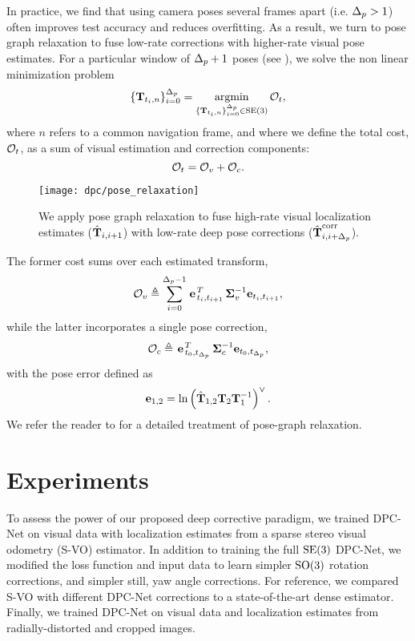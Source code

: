 In practice, we find that using camera poses several frames apart (i.e. $\Delta_p > 1$) often improves test accuracy and reduces overfitting. As a result, we turn to pose graph relaxation to fuse low-rate corrections with higher-rate visual pose estimates. For a particular window of $\Delta_p + 1$ poses (see ), we solve the non linear minimization problem
\begin{equation}
	\{\boldsymbol{\mathbf{T}}_{t_i, n} \}_{i=0}^{\Delta_p} = \operatorname*{argmin}_{\{\boldsymbol{\mathbf{T}}_{t_i, n} \}_{i=0}^{\Delta_p} \in \mathrm{SE}(3)} \mathcal{O}_t,
\end{equation}
where $n$ refers to a common navigation frame, and where we define the total cost, $\mathcal{O}_t$, as a sum of visual estimation and correction components:
\begin{equation}
	\mathcal{O}_t = \mathcal{O}_v + \mathcal{O}_c.
\end{equation}

\begin{figure}
	\centering
	\texttt{[image: dpc/pose\_relaxation]}
	\caption{We apply pose graph relaxation to fuse high-rate visual localization estimates ($\hat{\boldsymbol{\mathbf{T}}}_{i,i+1}$) with low-rate deep pose corrections ($\hat{\boldsymbol{\mathbf{T}}}_{i,i+\Delta_p}^{\text{corr}}$).}
	\label{fig:posegraph_relaxation}
	\vspace{-1em}
\end{figure}

\noindent The former cost sums over each estimated transform,
\begin{equation}
	\mathcal{O}_v \triangleq \sum_{i=0}^{\Delta_p-1}\left.{\boldsymbol{\mathbf{e}}}\right.^T_{t_i,t_{i+1}}\boldsymbol{\mathbf{\Sigma}}_v^{-1} \boldsymbol{\mathbf{e}}_{t_i,t_{i+1}},
\end{equation}
while the latter incorporates a single pose correction,
\begin{equation}
	\mathcal{O}_c \triangleq \left.{\boldsymbol{\mathbf{e}}}\right.^T_{t_0,t_{\Delta_p}}\boldsymbol{\mathbf{\Sigma}}_c^{-1} \boldsymbol{\mathbf{e}}_{t_0,t_{\Delta_p}},
\end{equation}
with the pose error defined as 
\begin{equation}
	\boldsymbol{\mathbf{e}}_{1,2} = \text{ln}\left({\hat{\boldsymbol{\mathbf{T}}}_{1,2} \boldsymbol{\mathbf{T}}_{2}  \boldsymbol{\mathbf{T}}^{-1}_{1}} \right)^{\vee}.
\end{equation}
We refer the reader to \cite{Barfoot2017-ri} for a detailed treatment of pose-graph relaxation.

\section{Experiments}
To assess the power of our proposed deep corrective paradigm, we trained DPC-Net on visual data with localization estimates from a sparse stereo visual odometry (S-VO) estimator. In addition to training the full $\mathrm{SE}(3)$ DPC-Net, we modified the loss function and input data to learn simpler $\mathrm{SO}(3)$ rotation corrections, and simpler still, yaw angle corrections. For reference, we compared S-VO with different DPC-Net corrections to a state-of-the-art dense estimator. Finally, we trained DPC-Net on visual data and localization estimates from radially-distorted and cropped images. 

